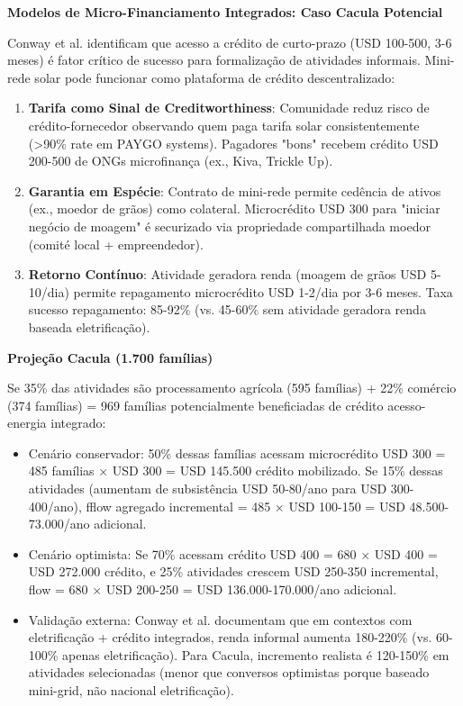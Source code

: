 \documentclass[12pt, a4paper]{article}
\begin{document}
{{{{{{{{{{{\textbf{Modelos de Micro-Financiamento Integrados: Caso Cacula Potencial}

Conway et al. identificam que acesso a crédito de curto-prazo (USD 100-500, 3-6 meses) é fator crítico de sucesso para formalização de atividades informais. Mini-rede solar pode funcionar como plataforma de crédito descentralizado:

\begin{enumerate}
\item \textbf{Tarifa como Sinal de Creditworthiness}: Comunidade reduz risco de crédito-fornecedor observando quem paga tarifa solar consistentemente (>90\% rate em PAYGO systems). Pagadores "bons" recebem crédito USD 200-500 de ONGs microfinança (ex., Kiva, Trickle Up).

\item \textbf{Garantia em Espécie}: Contrato de mini-rede permite cedência de ativos (ex., moedor de grãos) como colateral. Microcrédito USD 300 para "iniciar negócio de moagem" é securizado via propriedade compartilhada moedor (comité local + empreendedor).

\item \textbf{Retorno Contínuo}: Atividade geradora renda (moagem de grãos USD 5-10/dia) permite repagamento microcrédito USD 1-2/dia por 3-6 meses. Taxa sucesso repagamento: 85-92\% (vs. 45-60\% sem atividade geradora renda baseada eletrificação).
\end{enumerate}

\textbf{Projeção Cacula (1.700 famílias)}

Se 35\% das atividades são processamento agrícola (595 famílias) + 22\% comércio (374 famílias) = 969 famílias potencialmente beneficiadas de crédito acesso-energia integrado:

\begin{itemize}
\item Cenário conservador: 50\% dessas famílias acessam microcrédito USD 300 = 485 famílias × USD 300 = USD 145.500 crédito mobilizado. Se 15\% dessas atividades (aumentam de subsistência USD 50-80/ano para USD 300-400/ano), fflow agregado incremental = 485 × USD 100-150 = USD 48.500-73.000/ano adicional.

\item Cenário optimista: Se 70\% acessam crédito USD 400 = 680 × USD 400 = USD 272.000 crédito, e 25\% atividades crescem USD 250-350 incremental, flow = 680 × USD 200-250 = USD 136.000-170.000/ano adicional.

\item Validação externa: Conway et al. documentam que em contextos com eletrificação + crédito integrados, renda informal aumenta 180-220\% (vs. 60-100\% apenas eletrificação). Para Cacula, incremento realista é 120-150\% em atividades selecionadas (menor que conversos optimistas porque baseado mini-grid, não nacional eletrificação).
\end{itemize}

}}}}}}}}}}}
\end{document}
